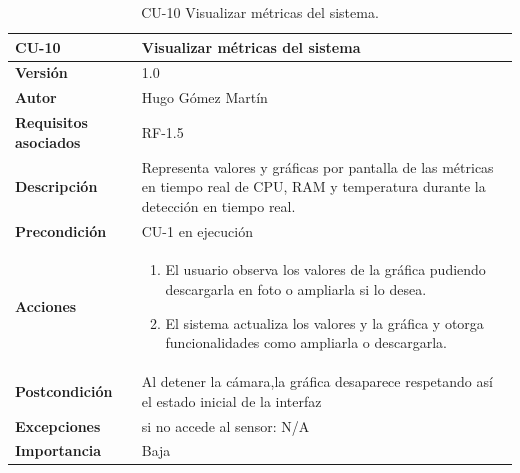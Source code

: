 \begin{table}[p]
	\centering
	\begin{tabularx}{\linewidth}{ p{} p{} }
		\toprule
		\textbf{CU-10}    & \textbf{Visualizar métricas del sistema}\\
		\toprule
		\textbf{Versión}              & 1.0    \\
		\textbf{Autor}                & Hugo Gómez Martín \\
		\textbf{Requisitos asociados} & RF-1.5 \\
		\textbf{Descripción}          & Representa valores y gráficas por pantalla de las métricas en tiempo real de CPU, RAM y temperatura durante la detección en tiempo real. \\
		\textbf{Precondición}         & CU-1 en ejecución \\
		\textbf{Acciones}             &
		\begin{enumerate}
			\def\labelenumi{\arabic{enumi}.}
			\tightlist
			\item El usuario observa los valores de la gráfica pudiendo descargarla en foto o ampliarla si lo desea.
			\item El sistema actualiza los valores y la gráfica y otorga funcionalidades como ampliarla o descargarla.
		\end{enumerate}\\
		\textbf{Postcondición}        & Al detener la cámara,la gráfica desaparece respetando así el estado inicial de la interfaz \\
		\textbf{Excepciones}          & si no accede al sensor: N/A \\
		\textbf{Importancia}          & Baja \\
		\bottomrule
	\end{tabularx}
	\caption{CU-10 Visualizar métricas del sistema.}
\end{table}

